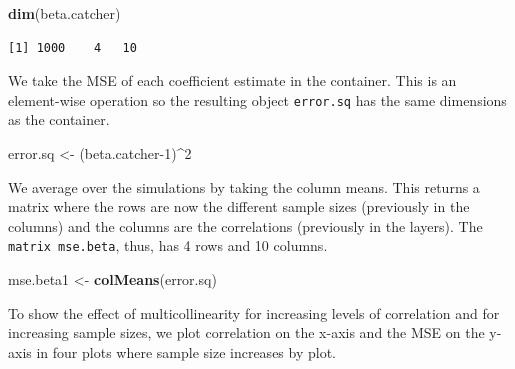 \documentclass[]{article}
\newenvironment{Shaded}{\begin{snugshade}}{\end{snugshade}}
\newcommand{\DecValTok}[1]{\textcolor[rgb]{0.00,0.00,0.81}{#1}}
\newcommand{\KeywordTok}[1]{\textcolor[rgb]{0.13,0.29,0.53}{\textbf{#1}}}
\newcommand{\NormalTok}[1]{#1}
\newcommand{\OperatorTok}[1]{\textcolor[rgb]{0.81,0.36,0.00}{\textbf{#1}}}
\newcommand{\StringTok}[1]{\textcolor[rgb]{0.31,0.60,0.02}{#1}}
\begin{document}
\begin{Shaded}
\begin{Highlighting}[]
\KeywordTok{dim}\NormalTok{(beta.catcher)}
\end{Highlighting}
\end{Shaded}

\begin{verbatim}
[1] 1000    4   10
\end{verbatim}

We take the MSE of each coefficient estimate in the container. This is an element-wise operation so the resulting object \texttt{error.sq} has the same dimensions as the container.

\begin{Shaded}
\begin{Highlighting}[]
\NormalTok{error.sq <-}\StringTok{ }\NormalTok{(beta.catcher}\DecValTok{-1}\NormalTok{)}\OperatorTok{^}\DecValTok{2} 
\end{Highlighting}
\end{Shaded}

We average over the simulations by taking the column means. This returns a matrix where the rows are now the different sample sizes (previously in the columns) and the columns are the correlations (previously in the layers). The \texttt{matrix\ mse.beta}, thus, has 4 rows and 10 columns.

\begin{Shaded}
\begin{Highlighting}[]
\NormalTok{mse.beta1 <-}\StringTok{ }\KeywordTok{colMeans}\NormalTok{(error.sq) }
\end{Highlighting}
\end{Shaded}

To show the effect of multicollinearity for increasing levels of correlation and for increasing sample sizes, we plot correlation on the x-axis and the MSE on the y-axis in four plots where sample size increases by plot.
\end{document}
